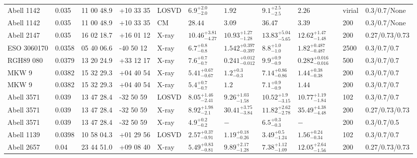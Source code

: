 \begin{landscape}
\begin{center}
{\begin{longtable}{llllllllllll}
Abell 1142 & 0.035 & 11 00 48.9 & +10 33 35 & LOSVD & ${6.9}^{+2.0}_{-2.0}$ & ${1.92}^{}_{}$ & ${9.1}^{+2.5}_{-2.5}$ & ${2.26}^{}_{}$ & \citet{AB11.1} & virial & 0.3/0.7/None \\
Abell 1142 & 0.035 & 11 00 48.9 & +10 33 35 & CM & ${28.44}^{}_{}$ & ${3.09}^{}_{}$ & ${36.47}^{}_{}$ & ${3.39}^{}_{}$ & \citet{RI06.1} & 200 & 0.3/0.7/None \\
Abell 2147 & 0.035 & 16 02 18.7 & +16 01 12 & X-ray & ${10.46}^{+3.81}_{-4.27}$ & ${10.93}^{+1.27}_{-1.28}$ & ${13.83}^{+5.04}_{-5.65}$ & ${12.62}^{+1.47}_{-1.48}$ & \citet{BA14.1} & 200 & 0.27/0.73/0.73 \\
ESO 3060170 & 0.0358 & 05 40 06.6 & -40 50 12 & X-ray & ${6.7}^{+0.8}_{-0.8}$ & ${1.542}^{+0.397}_{-0.397}$ & ${8.8}^{+1.0}_{-1.0}$ & ${1.82}^{+0.487}_{-0.487}$ & \citet{GA06.1} & 2500 & 0.3/0.7/0.7 \\
RGH89 080 & 0.0379 & 13 20 24.9 & +33 12 17 & X-ray & ${7.6}^{+0.7}_{-0.7}$ & ${0.241}^{+0.012}_{-0.012}$ & ${9.9}^{+0.9}_{-0.9}$ & ${0.282}^{+0.016}_{-0.016}$ & \citet{GA06.1} & 500 & 0.3/0.7/0.7 \\
MKW 9 & 0.0382 & 15 32 29.3 & +04 40 54 & X-ray & ${5.41}^{+0.67}_{-0.67}$ & ${1.2}^{+0.3}_{-0.3}$ & ${7.14}^{+0.86}_{-0.86}$ & ${1.44}^{+0.38}_{-0.38}$ & \citet{PO05.1} & 200 & 0.3/0.7/0.7 \\
MKW 9 & 0.0382 & 15 32 29.3 & +04 40 54 & X-ray & ${5.4}^{+0.7}_{-0.7}$ & ${1.2}^{}_{}$ & ${7.1}^{+0.9}_{-0.9}$ & ${1.44}^{}_{}$ & \citet{PR05.1} & 200 & 0.3/0.7/0.7 \\
Abell 3571 & 0.039 & 13 47 28.4 & -32 50 59 & LOSVD & ${8.05}^{+1.46}_{-2.41}$ & ${9.26}^{+1.03}_{-1.58}$ & ${10.52}^{+1.9}_{-3.15}$ & ${10.77}^{+1.19}_{-1.84}$ & \citet{WO10.1} & 102 & 0.3/0.7/0.7 \\
Abell 3571 & 0.039 & 13 47 28.4 & -32 50 59 & X-ray & ${8.92}^{+1.98}_{-2.1}$ & ${30.41}^{+3.75}_{-3.84}$ & ${11.82}^{+2.62}_{-2.78}$ & ${35.49}^{+4.38}_{-4.48}$ & \citet{BA14.1} & 200 & 0.27/0.73/0.73 \\
Abell 3571 & 0.039 & 13 47 28.4 & -32 50 59 & X-ray & ${4.9}^{+0.2}_{-0.2}$ & ${-}^{}_{}$ & ${6.5}^{+0.3}_{-0.3}$ & ${-}^{}_{}$ & \citet{XU01.1} & 200 & 0.3/0.7/0.5 \\
Abell 1139 & 0.0398 & 10 58 04.3 & +01 29 56 & LOSVD & ${2.57}^{+0.37}_{-0.91}$ & ${1.19}^{+0.18}_{-0.26}$ & ${3.49}^{+0.5}_{-1.24}$ & ${1.56}^{+0.24}_{-0.34}$ & \citet{WO10.1} & 102 & 0.3/0.7/0.7 \\
Abell 2657 & 0.04 & 23 44 51.0 & +09 08 40 & X-ray & ${5.49}^{+0.83}_{-0.81}$ & ${9.89}^{+2.17}_{-1.28}$ & ${7.38}^{+1.12}_{-1.09}$ & ${12.05}^{+2.64}_{-1.56}$ & \citet{BA14.1} & 200 & 0.27/0.73/0.73 \\

\end{longtable}}
\end{center}
\end{landscape}
